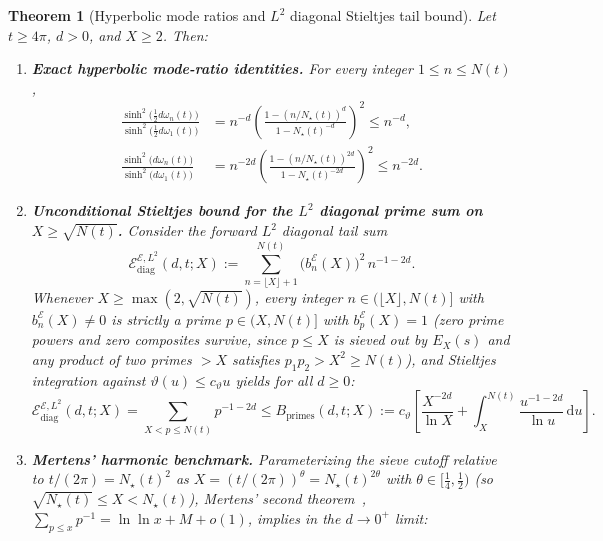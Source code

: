 \documentclass[11pt,reqno]{amsart}
\theoremstyle{plain}
\newtheorem{theorem}{Theorem}[section]
\theoremstyle{definition}
\theoremstyle{remark}
\numberwithin{equation}{section}
\newcommand{\dd}{\,\mathrm{d}}
\begin{document}
\begin{theorem}[Hyperbolic mode ratios and $L^2$ diagonal Stieltjes tail bound]\label{thm:stieltjes_diag}
Let $t \ge 4\pi$, $d > 0$, and $X \ge 2$. Then:
\begin{enumerate}[label=\textup{(\roman*)},leftmargin=2.2em]
\item \textbf{Exact hyperbolic mode-ratio identities.} For every integer $1 \le n \le N(t)$,
\begin{align}
\frac{\sinh^2\!\bigl(\frac{1}{2}d\omega_n(t)\bigr)}{\sinh^2\!\bigl(\frac{1}{2}d\omega_1(t)\bigr)} &= n^{-d}\!\left(\frac{1 - (n/N_\star(t))^d}{1 - N_\star(t)^{-d}}\right)^{\!2} \le n^{-d}, \label{eq:half_sinh_ratio}\\
\frac{\sinh^2\!\bigl(d\omega_n(t)\bigr)}{\sinh^2\!\bigl(d\omega_1(t)\bigr)} &= n^{-2d}\!\left(\frac{1 - (n/N_\star(t))^{2d}}{1 - N_\star(t)^{-2d}}\right)^{\!2} \le n^{-2d}. \label{eq:full_sinh_ratio}
\end{align}
\item \textbf{Unconditional Stieltjes bound for the $L^2$ diagonal prime sum on $X \ge \sqrt{N(t)}$.} Consider the forward $L^2$ diagonal tail sum
\begin{equation}\label{eq:L2_diag_def}
\mathcal{E}_{\mathrm{diag}}^{\mathcal{E},L^2}(d,t; X) := \sum_{n = \lfloor X\rfloor + 1}^{N(t)} \bigl(b_n^{\mathcal{E}}(X)\bigr)^2\,n^{-1 - 2d}.
\end{equation}
Whenever $X \ge \max(2, \sqrt{N(t)})$, every integer $n \in (\lfloor X\rfloor, N(t)]$ with $b_n^{\mathcal{E}}(X) \neq 0$ is strictly a prime $p \in (X, N(t)]$ with $b_p^{\mathcal{E}}(X) = 1$ (zero prime powers and zero composites survive, since $p \le X$ is sieved out by $E_X(s)$ and any product of two primes $> X$ satisfies $p_1 p_2 > X^2 \ge N(t)$), and Stieltjes integration against $\vartheta(u) \le c_\vartheta u$ yields for all $d \ge 0$:
\begin{equation}\label{eq:stieltjes_L2}
\mathcal{E}_{\mathrm{diag}}^{\mathcal{E},L^2}(d,t; X) = \sum_{X < p \le N(t)} p^{-1 - 2d} \le B_{\mathrm{primes}}(d,t; X) := c_\vartheta\left[\frac{X^{-2d}}{\ln X} + \int_X^{N(t)} \frac{u^{-1-2d}}{\ln u}\dd u\right].
\end{equation}
\item \textbf{Mertens' harmonic benchmark.} Parameterizing the sieve cutoff relative to $t/(2\pi) = N_\star(t)^2$ as $X = (t/(2\pi))^\theta = N_\star(t)^{2\theta}$ with $\theta \in [\frac{1}{4}, \frac{1}{2})$ (so $\sqrt{N_\star(t)} \le X < N_\star(t)$), Mertens' second theorem~\cite{mertens1874}, $\sum_{p \le x} p^{-1} = \ln\ln x + M + o(1)$, implies in the $d \to 0^+$ limit:

\end{enumerate}
\end{theorem}
\end{document}

